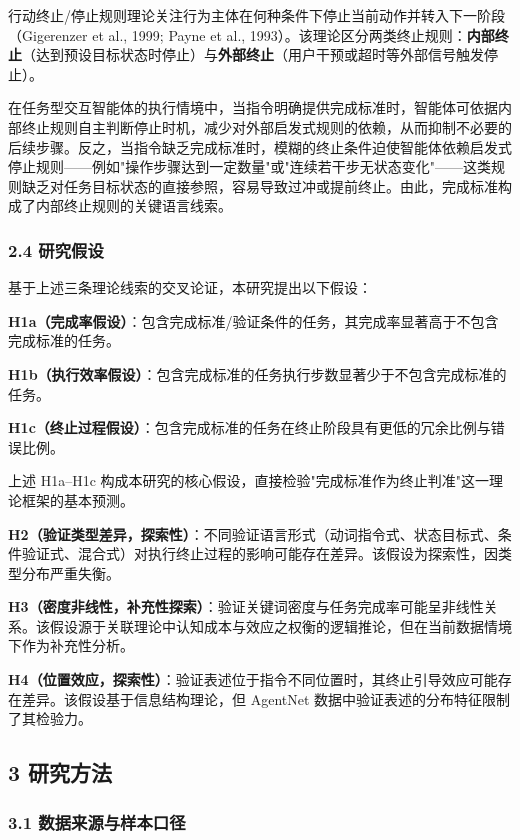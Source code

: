 \documentclass[12pt,a4paper,openany,oneside]{ctexrep}
\begin{document}
行动终止/停止规则理论关注行为主体在何种条件下停止当前动作并转入下一阶段（Gigerenzer et al., 1999; Payne et al., 1993）。该理论区分两类终止规则：\textbf{内部终止}（达到预设目标状态时停止）与\textbf{外部终止}（用户干预或超时等外部信号触发停止）。

在任务型交互智能体的执行情境中，当指令明确提供完成标准时，智能体可依据内部终止规则自主判断停止时机，减少对外部启发式规则的依赖，从而抑制不必要的后续步骤。反之，当指令缺乏完成标准时，模糊的终止条件迫使智能体依赖启发式停止规则——例如"操作步骤达到一定数量"或"连续若干步无状态变化"——这类规则缺乏对任务目标状态的直接参照，容易导致过冲或提前终止。由此，完成标准构成了内部终止规则的关键语言线索。

\subsubsection{2.4 研究假设}


基于上述三条理论线索的交叉论证，本研究提出以下假设：

\textbf{H1a（完成率假设）}：包含完成标准/验证条件的任务，其完成率显著高于不包含完成标准的任务。

\textbf{H1b（执行效率假设）}：包含完成标准的任务执行步数显著少于不包含完成标准的任务。

\textbf{H1c（终止过程假设）}：包含完成标准的任务在终止阶段具有更低的冗余比例与错误比例。

上述 H1a–H1c 构成本研究的核心假设，直接检验"完成标准作为终止判准"这一理论框架的基本预测。

\textbf{H2（验证类型差异，探索性）}：不同验证语言形式（动词指令式、状态目标式、条件验证式、混合式）对执行终止过程的影响可能存在差异。该假设为探索性，因类型分布严重失衡。

\textbf{H3（密度非线性，补充性探索）}：验证关键词密度与任务完成率可能呈非线性关系。该假设源于关联理论中认知成本与效应之权衡的逻辑推论，但在当前数据情境下作为补充性分析。

\textbf{H4（位置效应，探索性）}：验证表述位于指令不同位置时，其终止引导效应可能存在差异。该假设基于信息结构理论，但 AgentNet 数据中验证表述的分布特征限制了其检验力。

\subsection{3 研究方法}


\subsubsection{3.1 数据来源与样本口径}
\end{document}

